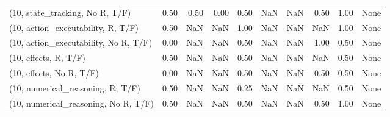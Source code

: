 \begin{table*}[h!]
\begin{adjustbox}{width=2\columnwidth,center}
\begin{tabular}{lrrr|rrr|rrr}
(10, state\_tracking, No R, T/F)       &                      0.50 &                  0.50 &                      0.00 &                          0.50 &                       NaN &                           NaN &                                   0.50 &                               1.00 &                                  None \\
(10, action\_executability, R, T/F)    &                      0.50 &                   NaN &                       NaN &                          1.00 &                       NaN &                           NaN &                                    NaN &                               1.00 &                                  None \\
(10, action\_executability, No R, T/F) &                      0.00 &                   NaN &                       NaN &                          0.50 &                       NaN &                           NaN &                                   1.00 &                               0.50 &                                  None \\
(10, effects, R, T/F)                 &                      0.50 &                   NaN &                       NaN &                          0.50 &                       NaN &                           NaN &                                    NaN &                               0.50 &                                  None \\
(10, effects, No R, T/F)              &                      0.00 &                   NaN &                       NaN &                          0.50 &                       NaN &                           NaN &                                   0.50 &                               0.50 &                                  None \\
(10, numerical\_reasoning, R, T/F)     &                      0.50 &                   NaN &                       NaN &                          0.25 &                       NaN &                           NaN &                                    NaN &                               0.50 &                                  None \\
(10, numerical\_reasoning, No R, T/F)  &                      0.50 &                   NaN &                       NaN &                          0.50 &                       NaN &                           NaN &                                   0.50 &                               1.00 &                                  None \\

\end{tabular}
\end{adjustbox}
\end{table*}
